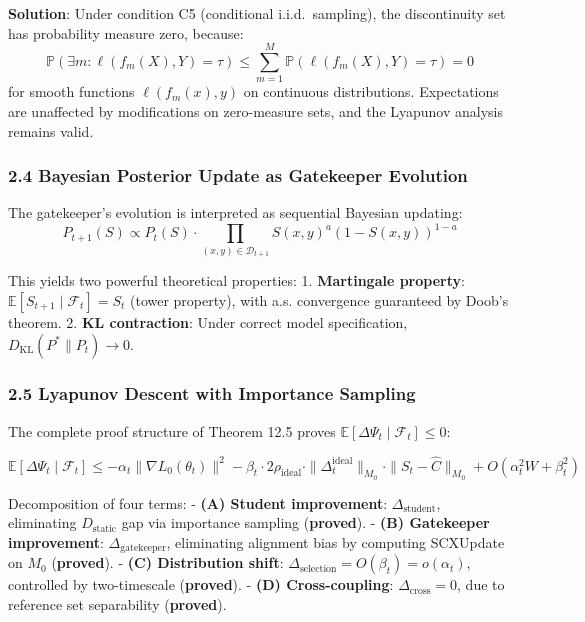\documentclass[
  12pt,
]{article}
\begin{document}
\textbf{Solution}: Under condition C5 (conditional i.i.d.\ sampling), the discontinuity set has probability measure zero, because:
\[\mathbb{P}(\exists m: \ell(f_m(X), Y) = \tau) \leq \sum_{m=1}^M \mathbb{P}(\ell(f_m(X), Y) = \tau) = 0\]
for smooth functions $\ell(f_m(x), y)$ on continuous distributions. Expectations are unaffected by modifications on zero-measure sets, and the Lyapunov analysis remains valid.

\subsubsection{2.4 Bayesian Posterior Update as Gatekeeper Evolution}\label{bayesian-posterior-update}

The gatekeeper's evolution is interpreted as sequential Bayesian updating:
\[P_{t+1}(S) \propto P_t(S) \cdot \prod_{(x,y) \in \mathcal{D}_{t+1}} S(x,y)^{a} (1 - S(x,y))^{1-a}\]

This yields two powerful theoretical properties:
1. \textbf{Martingale property}: $\mathbb{E}[S_{t+1} \mid \mathcal{F}_t] = S_t$ (tower property), with a.s. convergence guaranteed by Doob's theorem.
2. \textbf{KL contraction}: Under correct model specification, $D_{\text{KL}}(P^* \| P_t) \to 0$.

\subsubsection{2.5 Lyapunov Descent with Importance Sampling}\label{lyapunov-descent-importance-sampling}

The complete proof structure of Theorem 12.5 proves $\mathbb{E}[\Delta\Psi_t \mid \mathcal{F}_t] \leq 0$:

\[\mathbb{E}[\Delta\Psi_t \mid \mathcal{F}_t] \leq -\alpha_t \|\nabla L_0(\theta_t)\|^2 - \beta_t \cdot 2\rho_{\text{ideal}} \cdot \|\Delta_t^{\text{ideal}}\|_{M_0} \cdot \|S_t - \hat{C}\|_{M_0} + O(\alpha_t^2 W + \beta_t^2)\]

Decomposition of four terms:
- \textbf{(A) Student improvement}: $\Delta_{\text{student}}$, eliminating $D_{\text{static}}$ gap via importance sampling (\textbf{proved}).
- \textbf{(B) Gatekeeper improvement}: $\Delta_{\text{gatekeeper}}$, eliminating alignment bias by computing SCXUpdate on $M_0$ (\textbf{proved}).
- \textbf{(C) Distribution shift}: $\Delta_{\text{selection}} = O(\beta_t) = o(\alpha_t)$, controlled by two-timescale (\textbf{proved}).
- \textbf{(D) Cross-coupling}: $\Delta_{\text{cross}} = 0$, due to reference set separability (\textbf{proved}).
\end{document}
